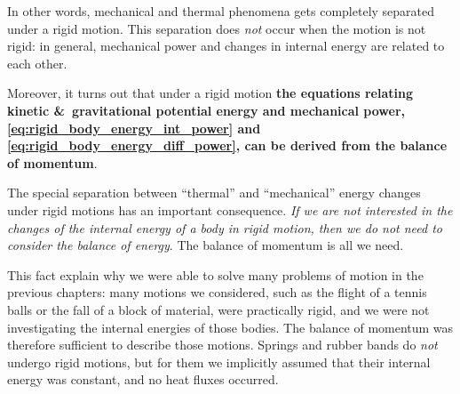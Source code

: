 \documentclass[a4paper,12pt,%
onecolumn,oneside,%
british%
]{memoir}
\newcommand*{\amp}{\&}
\renewcommand*{\|}[1][]{\nonscript\:#1\vert\nonscript\:\mathopen{}}
\begin{document}
In other words, mechanical and thermal phenomena gets completely separated under a rigid motion. This separation does \emph{not} occur when the motion is not rigid: in general, mechanical power and changes in internal energy are related to each other.

Moreover, it turns out that under a rigid motion \textbf{the equations relating kinetic \amp\ gravitational potential energy and mechanical power, \eqref{eq:rigid_body_energy_int_power} and \eqref{eq:rigid_body_energy_diff_power}, can be derived from the balance of momentum}.

The special separation between \enquote{thermal} and \enquote{mechanical} energy changes under rigid motions has an important consequence. \emph{If we are not interested in the changes of the internal energy of a body in rigid motion, then we do not need to consider the balance of energy}. The balance of momentum is all we need.

This fact explain why we were able to solve many problems of motion in the previous chapters: many motions we considered, such as the flight of a tennis balls or the fall of a block of material, were practically rigid, and we were not investigating the internal energies of those bodies. The balance of momentum was therefore sufficient to describe those motions. Springs and rubber bands do \emph{not} undergo rigid motions, but for them we implicitly assumed that their internal energy was constant, and no heat fluxes occurred.

\medskip

\end{document}
